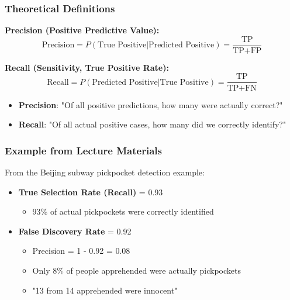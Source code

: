 \documentclass[12pt,a4paper]{article}
\begin{document}
\subsubsection{Theoretical Definitions}

\textbf{Precision (Positive Predictive Value):}
\begin{equation}
\text{Precision} = P(\text{True Positive} | \text{Predicted Positive}) = \frac{\text{TP}}{\text{TP} + \text{FP}}
\end{equation}

\textbf{Recall (Sensitivity, True Positive Rate):}
\begin{equation}
\text{Recall} = P(\text{Predicted Positive} | \text{True Positive}) = \frac{\text{TP}}{\text{TP} + \text{FN}}
\end{equation}

\begin{tcolorbox}[colback=green!5!white,colframe=green!75!black,title=Intuitive Understanding]
\begin{itemize}
    \item \textbf{Precision}: "Of all positive predictions, how many were actually correct?"
    \item \textbf{Recall}: "Of all actual positive cases, how many did we correctly identify?"
\end{itemize}
\end{tcolorbox}

\subsubsection{Example from Lecture Materials}

From the Beijing subway pickpocket detection example:

\begin{itemize}
    \item \textbf{True Selection Rate (Recall)} = 0.93
        \begin{itemize}
            \item 93\% of actual pickpockets were correctly identified
        \end{itemize}
    \item \textbf{False Discovery Rate} = 0.92 
        \begin{itemize}
            \item Precision = 1 - 0.92 = 0.08
            \item Only 8\% of people apprehended were actually pickpockets
            \item "13 from 14 apprehended were innocent"
        \end{itemize}
\end{itemize}
\end{document}

